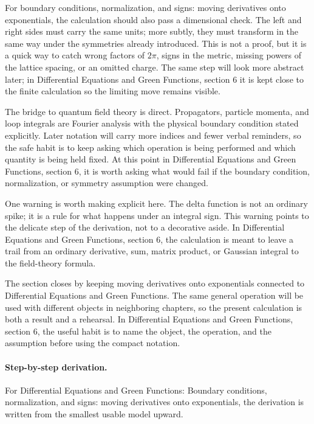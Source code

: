 For boundary conditions, normalization, and signs: moving derivatives onto exponentials, the calculation should also pass a dimensional check.  The left and right sides must carry the same units; more subtly, they must transform in the same way under the symmetries already introduced.  This is not a proof, but it is a quick way to catch wrong factors of \(2\pi\), signs in the metric, missing powers of the lattice spacing, or an omitted charge.  The same step will look more abstract later; in Differential Equations and Green Functions, section 6 it is kept close to the finite calculation so the limiting move remains visible.

The bridge to quantum field theory is direct.  Propagators, particle momenta, and loop integrals are Fourier analysis with the physical boundary condition stated explicitly.  Later notation will carry more indices and fewer verbal reminders, so the safe habit is to keep asking which operation is being performed and which quantity is being held fixed.  At this point in Differential Equations and Green Functions, section 6, it is worth asking what would fail if the boundary condition, normalization, or symmetry assumption were changed.

One warning is worth making explicit here.  The delta function is not an ordinary spike; it is a rule for what happens under an integral sign.  This warning points to the delicate step of the derivation, not to a decorative aside.  In Differential Equations and Green Functions, section 6, the calculation is meant to leave a trail from an ordinary derivative, sum, matrix product, or Gaussian integral to the field-theory formula.

The section closes by keeping moving derivatives onto exponentials connected to Differential Equations and Green Functions.  The same general operation will be used with different objects in neighboring chapters, so the present calculation is both a result and a rehearsal.  In Differential Equations and Green Functions, section 6, the useful habit is to name the object, the operation, and the assumption before using the compact notation.



\paragraph{Step-by-step derivation.}

For Differential Equations and Green Functions: Boundary conditions, normalization, and signs: moving derivatives onto exponentials, the derivation is written from the smallest usable model upward.

